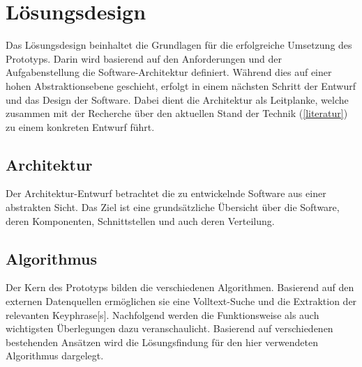 

\chapter{Lösungsdesign}

Das Lösungsdesign beinhaltet die Grundlagen für die erfolgreiche Umsetzung des Prototyps. Darin wird basierend auf den Anforderungen und der Aufgabenstellung die Software-Architektur definiert. Wäh\-rend dies auf einer hohen Abstraktionsebene geschieht, erfolgt in einem nächsten Schritt der Entwurf und das Design der Software. Dabei dient die Architektur als Leitplanke, welche zusammen mit der Recherche über den aktuellen Stand der Technik (\autoref{literatur}) zu einem konkreten Entwurf führt.


\section{Architektur}\label{architecture}


Der Architektur-Entwurf betrachtet die zu entwickelnde Software aus einer abstrakten Sicht. Das Ziel ist eine grundsätzliche Übersicht über die Software, deren Komponenten, Schnittstellen und auch deren Verteilung.







\section{Algorithmus}\label{algo}

Der Kern des Prototyps bilden die verschiedenen Algorithmen. Basierend auf den externen Datenquellen ermöglichen sie eine Volltext-Suche und die Extraktion der relevanten \gls{Keyphrase}[s]. Nachfolgend werden die Funktionsweise als auch wichtigsten Überlegungen dazu veranschaulicht. Basierend auf verschiedenen bestehenden Ansätzen wird die Lösungsfindung für den hier verwendeten Algorithmus dargelegt. 

